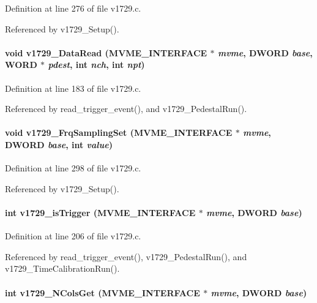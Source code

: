 Definition at line 276 of file v1729.c.

Referenced by v1729\_\-Setup().
\paragraph[{v1729\_\-DataRead}]{\setlength{\rightskip}{0pt plus 5cm}void v1729\_\-DataRead ({\bf MVME\_\-INTERFACE} $\ast$ {\em mvme}, \/  {\bf DWORD} {\em base}, \/  {\bf WORD} $\ast$ {\em pdest}, \/  int {\em nch}, \/  int {\em npt})}\hfill\label{v1729_8h_ad2cf5338fac61553fb64ee8538e34dac}


Definition at line 183 of file v1729.c.

Referenced by read\_\-trigger\_\-event(), and v1729\_\-PedestalRun().
\paragraph[{v1729\_\-FrqSamplingSet}]{\setlength{\rightskip}{0pt plus 5cm}void v1729\_\-FrqSamplingSet ({\bf MVME\_\-INTERFACE} $\ast$ {\em mvme}, \/  {\bf DWORD} {\em base}, \/  int {\em value})}\hfill\label{v1729_8h_a25d60b8be95abaf6da20a59bf3a6492a}


Definition at line 298 of file v1729.c.

Referenced by v1729\_\-Setup().
\paragraph[{v1729\_\-isTrigger}]{\setlength{\rightskip}{0pt plus 5cm}int v1729\_\-isTrigger ({\bf MVME\_\-INTERFACE} $\ast$ {\em mvme}, \/  {\bf DWORD} {\em base})}\hfill\label{v1729_8h_a22cff544a108b4a9504b02997c086158}


Definition at line 206 of file v1729.c.

Referenced by read\_\-trigger\_\-event(), v1729\_\-PedestalRun(), and v1729\_\-TimeCalibrationRun().
\paragraph[{v1729\_\-NColsGet}]{\setlength{\rightskip}{0pt plus 5cm}int v1729\_\-NColsGet ({\bf MVME\_\-INTERFACE} $\ast$ {\em mvme}, \/  {\bf DWORD} {\em base})}\hfill\label{v1729_8h_a48a3befe95ef335d93f58dfd4d90326b}


